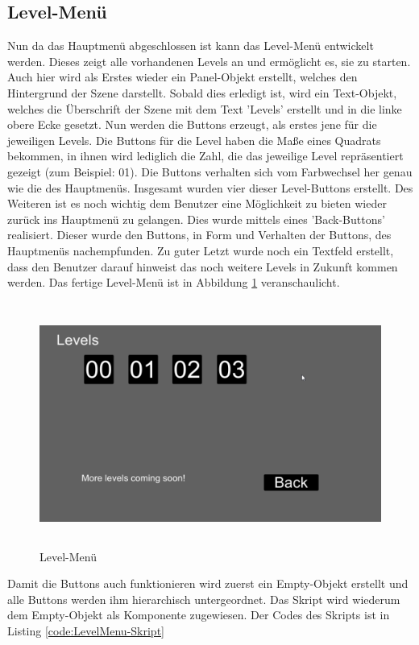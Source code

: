 \subsection{Level-Menü}
Nun da das Hauptmenü abgeschlossen ist kann das Level-Menü entwickelt werden. Dieses zeigt alle vorhandenen Levels an und ermöglicht es, sie zu starten.
Auch hier wird als Erstes wieder ein Panel-Objekt erstellt, welches den Hintergrund der Szene darstellt. Sobald dies erledigt ist, wird ein Text-Objekt, welches die Überschrift der Szene mit dem Text ’Levels’ erstellt und in die linke obere Ecke gesetzt. Nun werden die Buttons erzeugt, als erstes jene für die jeweiligen Levels. Die Buttons für die Level haben die Maße eines Quadrats bekommen, in ihnen wird lediglich die Zahl, die das jeweilige Level repräsentiert gezeigt (zum Beispiel: 01). Die Buttons verhalten sich vom Farbwechsel her genau wie die des Hauptmenüs. Insgesamt wurden vier dieser Level-Buttons erstellt. Des Weiteren ist es noch wichtig dem Benutzer eine Möglichkeit zu bieten wieder zurück ins Hauptmenü zu gelangen. Dies wurde mittels eines ’Back-Buttons’ realisiert. Dieser wurde den Buttons, in Form und Verhalten der Buttons, des Hauptmenüs nachempfunden. Zu guter Letzt wurde noch ein Textfeld erstellt, dass den Benutzer darauf hinweist das noch weitere Levels in Zukunft kommen werden. Das fertige Level-Menü ist in Abbildung \ref{Levelmenu} veranschaulicht.


\begin{figure}[H]
	\includegraphics[height=8cm]{images/Levelmenu.png}
	\caption{Level-Menü}
	\label{Levelmenu}
\end{figure}

Damit die Buttons auch funktionieren wird zuerst ein Empty-Objekt erstellt und alle Buttons werden ihm hierarchisch untergeordnet. Das Skript wird wiederum dem Empty-Objekt als Komponente zugewiesen. Der Codes des Skripts ist in Listing \cref{code:LevelMenu-Skript}

